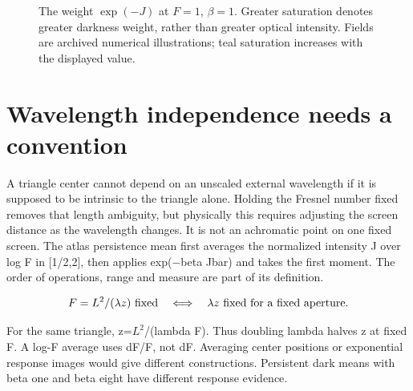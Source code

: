 \documentclass[11pt,oneside,openany]{book}
\begin{document}
\begin{figure}[htbp]
\caption[The weight $\exp(-J)$ at $F=1$, $\beta=1$]{The weight $\exp(-J)$ at $F=1$, $\beta=1$. Greater saturation denotes greater darkness weight, rather than greater optical intensity. Fields are archived numerical illustrations; teal saturation increases with the displayed value.}\label{fig:field-Dark1.0b1.0}
\end{figure}

\section{Wavelength independence needs a convention}\label{sec:slide84}

A triangle center cannot depend on an unscaled external wavelength if it is supposed to be intrinsic to the triangle alone. Holding the Fresnel number fixed removes that length ambiguity, but physically this requires adjusting the screen distance as the wavelength changes. It is not an achromatic point on one fixed screen. The atlas persistence mean first averages the normalized intensity J over log F in [1/2,2], then applies exp(\ensuremath{-}beta Jbar) and takes the first moment. The order of operations, range and measure are part of its definition.


\[F=L^2/(\lambda z)\ \hbox{fixed}\quad\Longleftrightarrow\quad\lambda z\ \hbox{fixed for a fixed aperture}.\]


For the same triangle, z=$L^2$/(lambda F). Thus doubling lambda halves z at fixed F. A log-F average uses dF/F, not dF. Averaging center positions or exponential response images would give different constructions. Persistent dark means with beta one and beta eight have different response evidence.
\end{document}
